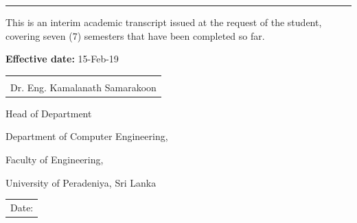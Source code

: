 \documentclass[12pt]{article}
\makeatletter
\newcommand{\sign}[1]{%
  \begin{tabular}[t]{@{}l@{}}
  \makebox[2.5in]{\dotfill}\\
  \strut#1\strut
  \end{tabular}%
}
\newcommand{\Date}{%
  \begin{tabular}[t]{@{}p{2.5in}@{}}
  \\[-2ex]
  \strut Date: \dotfill\strut
  \end{tabular}%
}
\makeatother
\begin{document}
%
%
%  


\noindent\rule{\textwidth}{1pt}
\vspace{5pt}
This is an interim academic transcript issued at the request of the student, covering seven (7) semesters that have been completed so far.
\vspace{5pt}

\noindent\textbf{Effective date:} 15-Feb-19

\vspace{45pt}

\noindent
\begin{minipage}[t]{0.5\linewidth}
    \raggedright
    \sign{Dr. Eng. Kamalanath Samarakoon}
    \par
    Head of Department\par
    Department of Computer Engineering, \par
    Faculty of Engineering, \par
    University of Peradeniya, Sri Lanka
\end{minipage}%
\hfill
  \begin{minipage}[t]{0.4\linewidth}
    \Date
  \end{minipage}
\end{document}
